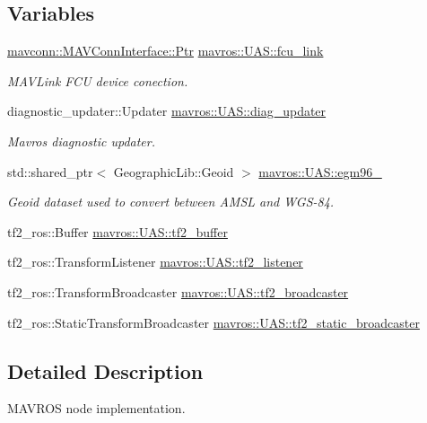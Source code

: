 \subsection*{Variables}
\begin{DoxyCompactItemize}
\item 
\mbox{\hyperlink{group__mavconn_gaff41078b805e1d8f85ed6fd2d87711ce}{mavconn\+::\+M\+A\+V\+Conn\+Interface\+::\+Ptr}} \mbox{\hyperlink{group__nodelib_gafc058c8fb3e90f26a88fdd808e1b3dac}{mavros\+::\+U\+A\+S\+::fcu\+\_\+link}}
\begin{DoxyCompactList}\small\item\em M\+A\+V\+Link F\+CU device conection. \end{DoxyCompactList}\item 
diagnostic\+\_\+updater\+::\+Updater \mbox{\hyperlink{group__nodelib_ga57e8229b5f18563820ff4ee5335d57a5}{mavros\+::\+U\+A\+S\+::diag\+\_\+updater}}
\begin{DoxyCompactList}\small\item\em Mavros diagnostic updater. \end{DoxyCompactList}\item 
std\+::shared\+\_\+ptr$<$ Geographic\+Lib\+::\+Geoid $>$ \mbox{\hyperlink{group__nodelib_ga35622da9e1bf22e43b269fbcbce65c40}{mavros\+::\+U\+A\+S\+::egm96\+\_}}
\begin{DoxyCompactList}\small\item\em Geoid dataset used to convert between A\+M\+SL and W\+G\+S-\/84. \end{DoxyCompactList}\item 
tf2\+\_\+ros\+::\+Buffer \mbox{\hyperlink{group__nodelib_ga9c221ed548579fd2008fd1ac4d2b13e3}{mavros\+::\+U\+A\+S\+::tf2\+\_\+buffer}}
\item 
tf2\+\_\+ros\+::\+Transform\+Listener \mbox{\hyperlink{group__nodelib_gaa3606f3a1043f5a4666d2d922cbb170a}{mavros\+::\+U\+A\+S\+::tf2\+\_\+listener}}
\item 
tf2\+\_\+ros\+::\+Transform\+Broadcaster \mbox{\hyperlink{group__nodelib_gaea0896a0daef68618142861b79395156}{mavros\+::\+U\+A\+S\+::tf2\+\_\+broadcaster}}
\item 
tf2\+\_\+ros\+::\+Static\+Transform\+Broadcaster \mbox{\hyperlink{group__nodelib_gad3a9ec1f5de439f1c43ade0b851bae38}{mavros\+::\+U\+A\+S\+::tf2\+\_\+static\+\_\+broadcaster}}
\end{DoxyCompactItemize}


\subsection{Detailed Description}
M\+A\+V\+R\+OS node implementation. 



